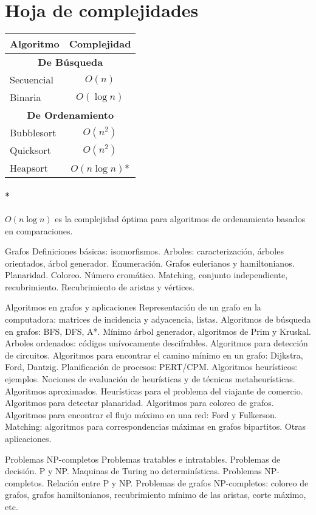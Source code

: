 \section{Hoja de complejidades}
\begin{center}
\begin{tabular}{|l|c|}
	\hline
	\textbf{Algoritmo} & \textbf{Complejidad} \\
	\hline
	\multicolumn{2}{|c|}{\cellcolor{blue!25}\textbf{De Búsqueda}}\\
	\hline
	Secuencial & \(O(n)\) \\
	\hline
	Binaria & \(O(\log{n})\) \\
	\hline
	\multicolumn{2}{|c|}{\cellcolor{blue!25}\textbf{De Ordenamiento}}\\
	\hline
	Bubblesort & \(O(n^2)\) \\
	\hline
	Quicksort & \(O(n^2)\) \\
	\hline
	Heapsort & \(O(n\log{n})\)* \\
	\hline
\end{tabular}
\end{center}

\paragraph{*} \(O(n\log{n})\) es la complejidad óptima para algoritmos de ordenamiento basados en comparaciones. 

\color{red}

Grafos Definiciones básicas: isomorfismos. Arboles: caracterización, árboles orientados, árbol generador. Enumeración. Grafos eulerianos y hamiltonianos. Planaridad. Coloreo. Número cromático. Matching, conjunto independiente, recubrimiento. Recubrimiento de aristas y vértices.



Algoritmos en grafos y aplicaciones Representación de un grafo en la computadora: matrices de incidencia y adyacencia, listas. Algoritmos de búsqueda en grafos: BFS, DFS, A*. Mínimo árbol generador, algoritmos de Prim y Kruskal. Arboles ordenados: códigos unívocamente descifrables. Algoritmos para detección de circuitos. Algoritmos para encontrar el camino mínimo en un grafo: Dijkstra, Ford, Dantzig. Planificación de procesos: PERT/CPM. Algoritmos heurísticos: ejemplos. Nociones de evaluación de heurísticas y de técnicas metaheurísticas. Algoritmos aproximados. Heurísticas para el problema del viajante de comercio. Algoritmos para detectar planaridad. Algoritmos para coloreo de grafos. Algoritmos para encontrar el flujo máximo en una red: Ford y Fulkerson. Matching: algoritmos para correspondencias máximas en grafos bipartitos. Otras aplicaciones.



Problemas NP-completos Problemas tratables e intratables. Problemas de decisión. P y NP. Maquinas de Turing no determinísticas. Problemas NP-completos. Relación entre P y NP. Problemas de grafos NP-completos: coloreo de grafos, grafos hamiltonianos, recubrimiento mínimo de las aristas, corte máximo, etc.



